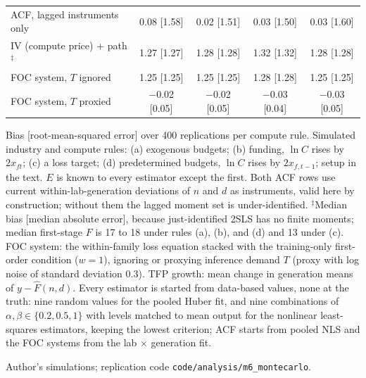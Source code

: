 \begin{table}[tp]
\begin{tabular}{@{}lcccc@{}}
ACF, lagged instruments only & 0.08 [1.58] & 0.02 [1.51] & 0.03 [1.50] & 0.03 [1.60] \\
IV (compute price) + path$^{\ddagger}$ & 1.27 [1.27] & 1.28 [1.28] & 1.32 [1.32] & 1.28 [1.28] \\
FOC system, $T$ ignored & 1.25 [1.25] & 1.25 [1.25] & 1.28 [1.28] & 1.25 [1.25] \\
FOC system, $T$ proxied & $-$0.02 [0.05] & $-$0.02 [0.05] & $-$0.03 [0.04] & $-$0.03 [0.05] \\
\bottomrule
\end{tabular}
\par\smallskip
\begin{tablenotes}Bias [root-mean-squared error] over 400 replications per compute rule. Simulated industry and compute rules: (a) exogenous budgets; (b) funding, $\ln C$ rises by $2x_{ft}$; (c) a loss target; (d) predetermined budgets, $\ln C$ rises by $2x_{f,t-1}$; setup in the text. $E$ is known to every estimator except the first. Both ACF rows use current within-lab-generation deviations of $n$ and $d$ as instruments, valid here by construction; without them the lagged moment set is under-identified. $^{\ddagger}$Median bias [median absolute error], because just-identified 2SLS has no finite moments; median first-stage $F$ is 17 to 18 under rules (a), (b), and (d) and 13 under (c). FOC system: the within-family loss equation stacked with the training-only first-order condition ($w=1$), ignoring or proxying inference demand $T$ (proxy with log noise of standard deviation 0.3). TFP growth: mean change in generation means of $y-\hat F(n,d)$. Every estimator is started from data-based values, none at the truth: nine random values for the pooled Huber fit, and nine combinations of $\alpha,\beta\in\{0.2,0.5,1\}$ with levels matched to mean output for the nonlinear least-squares estimators, keeping the lowest criterion; ACF starts from pooled NLS and the FOC systems from the lab $\times$ generation fit.\end{tablenotes}
\begin{tablenotes}[Source]Author's simulations; replication code \texttt{code/analysis/m6\_montecarlo}.\end{tablenotes}
\end{table}
